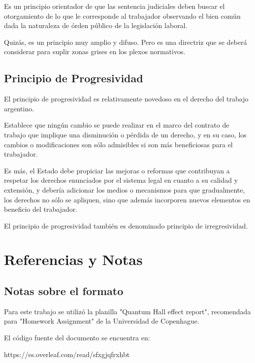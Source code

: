 \documentclass[a4paper]{article}
\begin{document}
Es un principio orientador de que las sentencia judiciales deben buscar el otorgamiento de lo que le corresponde al trabajador observando el bien común dada la naturaleza de órden público de la legislación laboral.

Quizás, es un principio muy amplio y difuso. Pero es una directriz que se deberá considerar para suplir zonas grises en los plexos normativos.

\subsection{Principio de Progresividad}

El principio de progresividad es relativamente novedoso en el derecho del trabajo argentino. 

Establece que ningún cambio se puede realizar en el marco del contrato de trabajo que implique una disminución o pérdida de un derecho, y en su caso, los cambios o modificaciones son sólo admisibles si son más beneficiosas para el trabajador. 

Es más, el Estado debe propiciar las mejoras o reformas que contribuyan a respetar los derechos enunciados por el sistema legal  en cuanto a su calidad y extensión, y debería adicionar los medios o mecanismos para que gradualmente, los derechos no sólo se apliquen, sino que además incorporen nuevos elementos en beneficio del trabajador. 

El principio de progresividad también es denominado principio de irregresividad. \cite{Ramirez2010}

\newpage
\section{Referencias y Notas}
\label{sec:latex}
\subsection{Notas sobre el formato}

Para este trabajo se utilizó la planilla "Quantum Hall effect report", recomendada para "Homework Assignment" de la Universidad de Copenhague.

El código fuente del documento se encuentra en:

https://es.overleaf.com/read/sfxgjqfrxhbt
\end{document}
